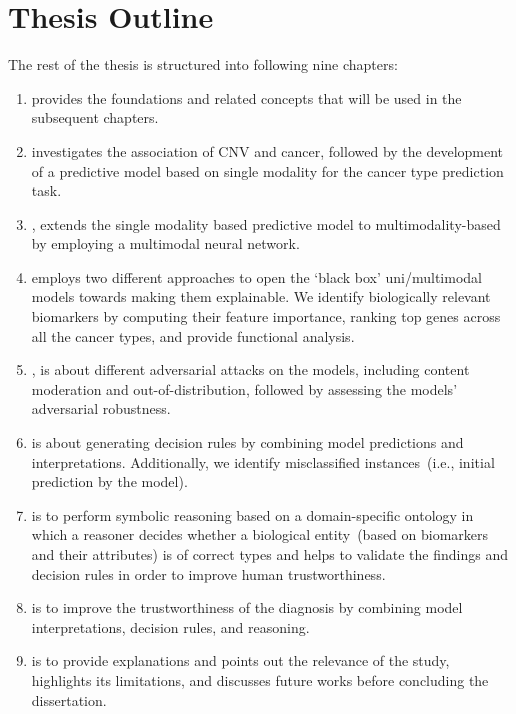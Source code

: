 \section{Thesis Outline} \label{structure}
The rest of the thesis is structured into following nine chapters:  
\begin{enumerate}[noitemsep]
    \item {} provides the foundations and related concepts that will be used in the subsequent chapters. 
    \item {} investigates the association of CNV and cancer, followed by the development of a predictive model based on single modality for the cancer type prediction task.  
    \item {}, extends the single modality based predictive model to multimodality-based by employing a multimodal neural network.  
    \item {} employs two different approaches to open the `black box' uni/multimodal models towards making them explainable. We identify biologically relevant biomarkers by computing their feature importance, ranking top genes across all the cancer types, and provide functional analysis.  
    \item {}, is about different adversarial attacks on the models, including content moderation and out-of-distribution, followed by assessing the models' adversarial robustness. 
    \item {} is about generating decision rules by combining model predictions and interpretations. Additionally, we identify  misclassified instances~(i.e., initial prediction by the model). 
    \item {} is to perform symbolic reasoning based on a domain-specific ontology in which a reasoner decides whether a biological entity~(based on biomarkers and their attributes) is of correct types and helps to validate the findings and decision rules in order to improve human trustworthiness. 
    \item {} is to improve the trustworthiness of the diagnosis by combining model interpretations, decision rules, and reasoning.
    \item {} is to provide explanations and points out the relevance of the study, highlights its limitations, and discusses future works before concluding the dissertation. 
\end{enumerate}



